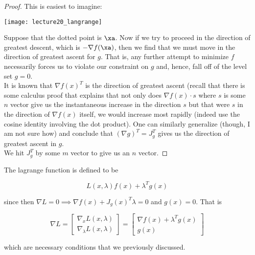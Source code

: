 \documentclass[../main.tex]{subfiles}
\begin{document}
\begin{proof}
    This is easiest to imagine:
\begin{center}
    \texttt{[image: lecture20\_langrange]}
\end{center}

Suppose that the dotted point is $\xa$. Now if we try to proceed in the direction of greatest descent, which is $- \nabla f(\xa)$, then we find that we must move in the direction of greatest ascent for $g$. That is, any further attempt to minimize $f$ necessarily forces us to violate our constraint on $g$ and, hence, fall off of the level set $g = 0$. \\

It is known that $\nabla f(x)^T$ is the direction of greatest ascent (recall that there is some calculus proof that explains that not only does $\nabla f(x) \cdot s$ where $s$ is some $n$ vector give us the instantaneous increase in the direction $s$ but that were $s$ in the direction of $\nabla f(x)$ itself, we would increase most rapidly (indeed use the cosine identity involving the dot product). One can similarly generalize (though, I am not sure how) and conclude that $(\nabla g)^T = J_{g}^T$ gives us the direction of greatest ascent in $g$. \\

We hit $J_{g}^T$ by some $m$ vector to give us an $n$ vector.
\end{proof}

\begin{definition}
    The lagrange function is defined to be

    \[
        L(x, \lambda) f(x) + \lambda^T g(x)
    \]

    since then $\nabla L = 0 \implies \nabla f(x) + J_{g}(x)^T \lambda = 0$ and $g(x) = 0$. That is

    \[
        \nabla L = 
        \begin{bmatrix}
            \nabla_{x} L(x, \lambda) \\
            \nabla_{\lambda} L(x, \lambda)
        \end{bmatrix} = 
        \begin{bmatrix}
            \nabla f(x) + \lambda^T g(x) \\
            g(x)
        \end{bmatrix}
    \]

    which are necessary conditions that we previously discussed.

\end{definition}
\end{document}

